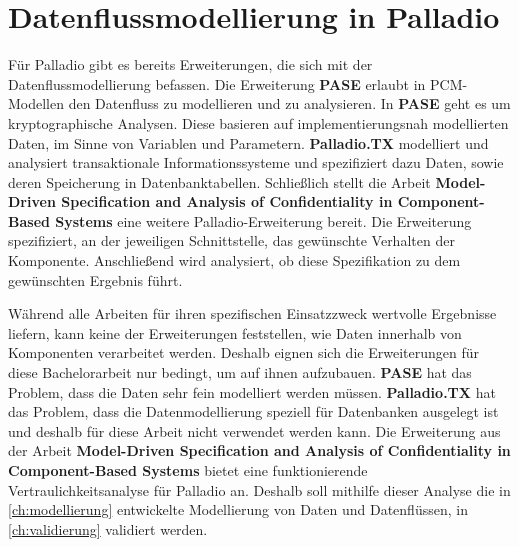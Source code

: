 \section{Datenflussmodellierung in Palladio}
\label{sec:palladioerweiterungen}
Für Palladio gibt es bereits Erweiterungen, die sich mit der Datenflussmodellierung befassen. Die Erweiterung \textbf{PASE} \cite{Pase} erlaubt in PCM-Modellen den Datenfluss zu modellieren und zu analysieren. In \textbf{PASE} geht es um kryptographische Analysen. Diese basieren auf implementierungsnah modellierten Daten, im Sinne von Variablen und Parametern. \textbf{Palladio.TX} \cite{PalladioTX} modelliert und analysiert transaktionale Informationssysteme und spezifiziert dazu Daten, sowie deren Speicherung in Datenbanktabellen. Schließlich stellt die Arbeit \textbf{Model-Driven Specification and Analysis of Confidentiality in Component-Based Systems} \cite{Kramera} eine weitere Palladio-Erweiterung bereit. Die Erweiterung spezifiziert, an der jeweiligen Schnittstelle, das gewünschte Verhalten der Komponente. Anschließend wird analysiert, ob diese Spezifikation zu dem gewünschten Ergebnis führt. \par
Während alle Arbeiten für ihren spezifischen Einsatzzweck wertvolle Ergebnisse liefern, kann keine der Erweiterungen feststellen, wie Daten innerhalb von Komponenten verarbeitet werden. Deshalb eignen sich die Erweiterungen für diese Bachelorarbeit nur bedingt, um auf ihnen aufzubauen. \textbf{PASE} hat das Problem, dass die Daten sehr fein modelliert werden müssen. \textbf{Palladio.TX} hat das Problem, dass die Datenmodellierung speziell für Datenbanken ausgelegt ist und deshalb für diese Arbeit nicht verwendet werden kann. Die Erweiterung aus der Arbeit \textbf{Model-Driven Specification and Analysis of Confidentiality in Component-Based Systems} bietet eine funktionierende Vertraulichkeitsanalyse für Palladio an. Deshalb soll mithilfe dieser Analyse die in \autoref{ch:modellierung} entwickelte Modellierung von Daten und Datenflüssen, in \ref{ch:validierung} validiert werden.

